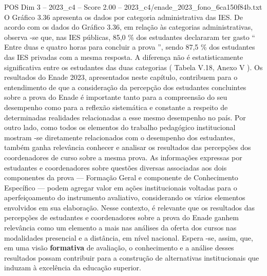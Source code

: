 \begin{textsample}{POS Dim 3 – 2023\_c4 – Score 2.00 – 2023\_c4/enade\_2023\_fono\_6ca150f84b.txt}
O Gráfico 3.36 apresenta os dados por categoria administrativa das IES.
De acordo com os dados do Gráfico 3.36, em relação às categorias administrativas, observa -se que, nas IES públicas, 85,0 \% dos estudantes declararam ter gasto “ Entre duas e quatro horas para concluir a prova ”, sendo 87,5 \% dos estudantes das IES privadas com a mesma resposta.
A diferença não é estatisticamente significativa entre os estudantes das duas categorias ( Tabela V.18, Anexo V ).
Os resultados do Enade 2023, apresentados neste capítulo, contribuem para o entendimento de que a consideração da percepção dos estudantes concluintes sobre a prova do Enade é importante tanto para a compreensão do seu desempenho como para a reflexão sistemática e constante a respeito de determinadas realidades relacionadas a esse mesmo desempenho no país.
Por outro lado, como todos os elementos do trabalho pedagógico institucional mostram -se diretamente relacionados com o desempenho dos estudantes, também ganha relevância conhecer e analisar os resultados das percepções dos coordenadores de curso sobre a mesma prova.
As informações expressas por estudantes e coordenadores sobre questões diversas associadas aos dois componentes da prova — Formação Geral e componente de Conhecimento Específico — podem agregar valor em ações institucionais voltadas para o aperfeiçoamento do instrumento avaliativo, considerando os vários elementos envolvidos em sua elaboração.
Nesse contexto, é relevante que os resultados das percepções de estudantes e coordenadores sobre a prova do Enade ganhem relevância como um elemento a mais nas análises da oferta dos cursos nas modalidades presencial e a distância, em nível nacional.
Espera -se, assim, que, em uma visão \textbf{formativa} de avaliação, o conhecimento e a análise desses resultados possam contribuir para a construção de alternativas institucionais que induzam à excelência da educação superior.

\end{textsample}
